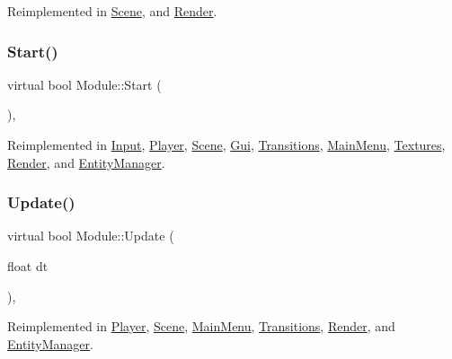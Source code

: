 Reimplemented in \mbox{\hyperlink{class_scene_a99b7629c7c9affe3fc2bd24a8c45bed4}{Scene}}, and \mbox{\hyperlink{class_render_a8a7339d22cc1019c02dd4778f4f36593}{Render}}.

\mbox{\label{class_module_aaf67046743296e8de310039a1dc95d86}} 
\subsubsection{\texorpdfstring{Start()}{Start()}}
{\footnotesize\ttfamily virtual bool Module\+::\+Start (\begin{DoxyParamCaption}{ }\end{DoxyParamCaption})\hspace{0.3cm}{\ttfamily [inline]}, {\ttfamily [virtual]}}



Reimplemented in \mbox{\hyperlink{class_input_a8519ba5884a6ea0d3ef332788ee248a8}{Input}}, \mbox{\hyperlink{class_player_a797198656a642b66fd8ec656153d8595}{Player}}, \mbox{\hyperlink{class_scene_a4be9030f1269eb74266ea1067d07f56f}{Scene}}, \mbox{\hyperlink{class_gui_ab62e1b47c26df1e5a69932becb0cc1de}{Gui}}, \mbox{\hyperlink{class_transitions_abc46bf6e67d0936641cc1d41c20e8be9}{Transitions}}, \mbox{\hyperlink{class_main_menu_a02d38874242aae89ce95925b5fad05f4}{Main\+Menu}}, \mbox{\hyperlink{class_textures_a15ed80517d40c16e670a9d968ce0944e}{Textures}}, \mbox{\hyperlink{class_render_afe6d22551e6d5bbcc55cdd20ab23afde}{Render}}, and \mbox{\hyperlink{class_entity_manager_ac2cdeaf31edc0c79e0a05f4da05d5351}{Entity\+Manager}}.

\mbox{\label{class_module_ac1a7b6dca73586b9cce2e67647af58d8}} 
\subsubsection{\texorpdfstring{Update()}{Update()}}
{\footnotesize\ttfamily virtual bool Module\+::\+Update (\begin{DoxyParamCaption}\item[{float}]{dt }\end{DoxyParamCaption})\hspace{0.3cm}{\ttfamily [inline]}, {\ttfamily [virtual]}}



Reimplemented in \mbox{\hyperlink{class_player_a637908f123cba18727999783a7534459}{Player}}, \mbox{\hyperlink{class_scene_a3b7592b8a1ec0317edad4f694ea2d99c}{Scene}}, \mbox{\hyperlink{class_main_menu_a0c2e38b67627d0ac2315c82ae46cd8ef}{Main\+Menu}}, \mbox{\hyperlink{class_transitions_acd6dd9daa6a80dd1b1e8330aa06c21c9}{Transitions}}, \mbox{\hyperlink{class_render_a7172f5776000ed7c973a26e35536f2d6}{Render}}, and \mbox{\hyperlink{class_entity_manager_ab86bf1458923878536cf87792ded0a9b}{Entity\+Manager}}.



